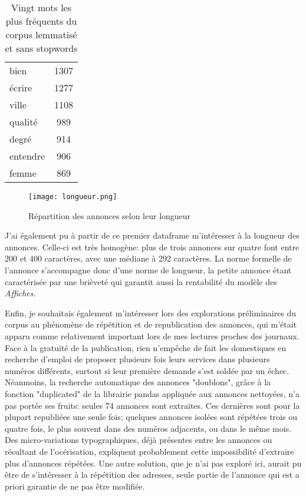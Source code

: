 \begin{table}[ht]
{\begin{tabular}{lc}
			bien                               & 1307                                      \\ 
			écrire                             & 1277                                      \\ 
			ville                              & 1108                                      \\ 
			qualité                            & 989                                       \\ 
			degré                              & 914                                       \\ 
			entendre                           & 906                                       \\ 
			femme                              & 869                                       \\   \hline
		\end{tabular}
	}
	\caption{Vingt mots les plus fréquents du corpus lemmatisé et sans stopwords}
\end{table}


\begin{figure}[h]
	\centering
	\texttt{[image: longueur.png]}
	\caption{Répartition des annonces selon leur longueur}
\end{figure}

J'ai également pu à partir de ce premier dataframe m'intéresser à la longueur des annonces. Celle-ci est très homogène: plus de trois annonces sur quatre font entre 200 et 400 caractères, avec une médiane à 292 caractères. La norme formelle de l'annonce s'accompagne donc d'une norme de longueur, la petite annonce étant caractérisée par une brièveté qui garantit aussi la rentabilité du modèle des \textit{Affiches}.

Enfin, je souhaitais également m'intéresser lors des explorations préliminaires du corpus au phénomène de répétition et de republication des annonces, qui m'était apparu comme relativement important lors de mes lectures proches des journaux. Face à la gratuité de la publication, rien n'empêche de fait les domestiques en recherche d'emploi de proposer plusieurs fois leurs services dans plusieurs numéros différents, surtout si leur première demande s'est soldée par un échec. Néanmoins, la recherche automatique des annonces "doublons", grâce à la fonction "duplicated" de la librairie pandas appliquée aux annonces nettoyées, n'a pas portée ses fruits: seules 74 annonces sont extraites. Ces dernières sont pour la plupart republiées une seule fois; quelques annonces isolées sont répétées trois ou quatre fois, le plus souvent dans des numéros adjacents, ou dans le même mois. Des micro-variations typographiques, déjà présentes entre les annonces ou résultant de l'océrisation, expliquent probablement cette impossibilité d'extraire plus d'annonces répétées. Une autre solution, que je n'ai pas exploré ici, aurait pu être de s'intéresser à la répétition des adresses, seule partie de l'annonce qui est a priori garantie de ne pas être modifiée.